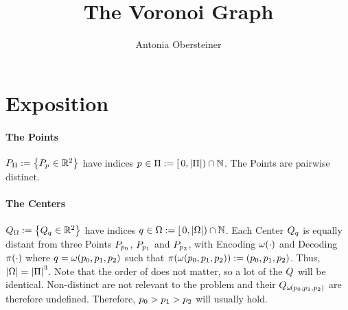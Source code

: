 \documentclass{article}
\author{Antonia Obersteiner}
\title{The Voronoi Graph}
\begin{document}
\section{Exposition}
\paragraph{The Points} $\points := \set{\point[\pointindex] \in\reals^2}$ have
indices $\pointindex \in \pointindices := \oival{0, \abs{\pointindices}}\cap\nats$.
The Points are pairwise distinct.
\paragraph{The Centers} $\cnters := \set{\cnter[\cnterindex] \in\reals^2}$ have
indices $\cnterindex \in \cnterindices := \oival{0, \abs{\cnterindices}}\cap\nats$.
Each Center $\cnter[\cnterindex]$ is equally distant from three Points
	$\point[{\pointindex[0]}]$,
	$\point[{\pointindex[1]}]$ and
	$\point[{\pointindex[2]}]$,
with Encoding $\encode{\cdot}$ and Decoding $\decode{\cdot}$ where
$\cnterindex = \encode{\triple{\pointindex}}$ such that
$\decode{\encode{\triple{\pointindex}}} := \of{\triple{\pointindex}}$.
Thus, $\abs{\cnterindices} = \abs{\pointindices}^3$.
Note that the order of \texttriple{\pointindex} does not matter,
so a lot of the $\cnter$ will be identical.
Non-distinct \texttriple{\pointindex} are not relevant to the problem and their
$\cnter[\encode{\triple{\pointindex}}]$ are therefore undefined.
Therefore, $\pointindex[0] > \pointindex[1] > \pointindex[2]$ will usually hold.
\end{document}
